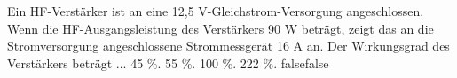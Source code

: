     {Ein HF-Verstärker ist an eine 12,5 V-Gleichstrom-Versorgung angeschlossen. Wenn die HF-Ausgangsleistung des Verstärkers 90 W beträgt, zeigt das an die Stromversorgung angeschlossene Strommessgerät 16 A an. Der Wirkungsgrad des Verstärkers beträgt ...}
    {45 \%.}
    {55 \%.}
    {100 \%.}
    {222 \%.}
    {false}{false}